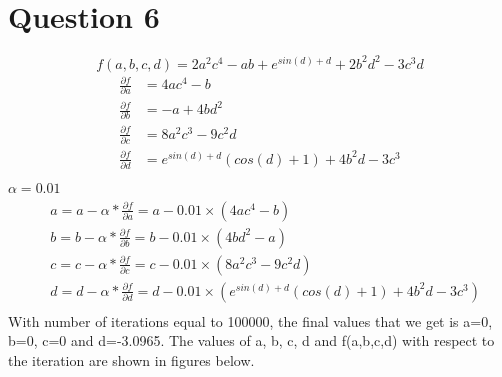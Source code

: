 \documentclass[letter, 10pt]{article}
\begin{document}
\section*{Question 6}
\begin{equation*}
    f(a,b,c,d) = 2a^2c^4 - ab + e^{sin(d)+d} + 2b^2d^2 - 3c^3d
\end{equation*}
\begin{align*}
    \frac{\partial f}{\partial a} &= 4ac^4 - b\\
    \frac{\partial f}{\partial b} &= - a + 4bd^2\\
    \frac{\partial f}{\partial c} &= 8a^2c^3 - 9c^2d\\
    \frac{\partial f}{\partial d} &= e^{sin(d)+d}(cos(d) + 1) + 4b^2d - 3c^3\\
\end{align*}
$\alpha = 0.01$
\begin{align*}
    & a = a - \alpha* \frac{\partial f}{\partial a} = a - 0.01\times(4ac^4 - b)\\
    & b = b - \alpha* \frac{\partial f}{\partial b} = b - 0.01\times(4bd^2 - a)\\
    & c = c - \alpha* \frac{\partial f}{\partial c} = c - 0.01\times(8a^2c^3 - 9c^2d)\\
    & d = d - \alpha* \frac{\partial f}{\partial d} = d - 0.01\times(e^{sin(d)+d}(cos(d) + 1) + 4b^2d - 3c^3)\\
\end{align*}
With number of iterations equal to 100000, the final values that we get is a=0, b=0, c=0 and d=-3.0965. The values of a, b, c, d and f(a,b,c,d) with respect to the iteration are shown in figures below.
\end{document}
